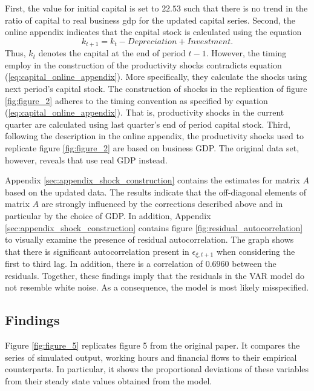 First, the value for initial capital is set to $22.53$ such that there is no trend in the ratio of capital to real business gdp for the updated capital series. Second, the online appendix indicates that the capital stock is calculated using the equation
\begin{equation} 
	\label{eq:capital_online_appendix}
	k_{t+1} = k_{t} - Depreciation + Investment.
\end{equation} 
Thus, ${k}_t$ denotes the capital at the end of period $t-1$. However, the timing \citeauthor{JERMANNfinancial} employ in the construction of the productivity shocks contradicts equation (\ref{eq:capital_online_appendix}). More specifically, they  calculate the shocks using next period's capital stock. The construction of shocks in the replication of figure \ref{fig:figure_2} adheres to the timing convention as specified by equation (\ref{eq:capital_online_appendix}). That is, productivity shocks in the current quarter are calculated using last quarter's end of period capital stock. Third, following the description in the online appendix, the productivity shocks used to replicate figure \ref{fig:figure_2} are based on business GDP. The original data set, however, reveals that \citeauthor{JERMANNfinancial} use real GDP instead. 

Appendix \ref{sec:appendix_shock_construction} contains the estimates for matrix $A$ based on the updated data. The results indicate that the off-diagonal elements of matrix $A$ are strongly influenced by the corrections described above and in particular by the choice of GDP. In addition, Appendix \ref{sec:appendix_shock_construction} contains figure \ref{fig:residual_autocorrelation} to visually examine the presence of residual autocorrelation. The graph shows that there is significant autocorrelation present in ${\epsilon}_{\xi,t+1}$ when considering the first to third lag. In addition, there is a correlation of $0.6960$ between the residuals. Together, these findings imply that the residuals in the VAR model do not resemble white noise. As a consequence, the model is most likely misspecified.


\subsection{Findings}
\label{sec:findings}



Figure \ref{fig:figure_5} replicates figure 5 from the original paper. It compares  the series of simulated output, working hours and financial flows to their empirical counterparts. In particular, it shows the proportional deviations of these variables from their steady state values obtained from the model.
